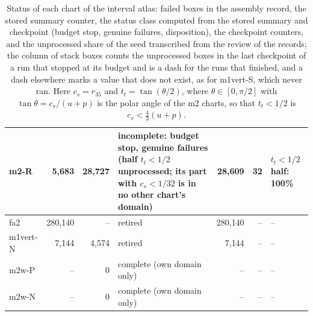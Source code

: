 \documentclass[11pt]{article}
\theoremstyle{definition}
\theoremstyle{remark}
\begin{document}
\begin{table}[t]
\begin{tabular}{@{}L{1.5cm}rrL{3.5cm}rrL{3.0cm}@{}}
m2-R & 5{,}683 & 28{,}727 & incomplete: budget stop, genuine failures (half $t_t<1/2$ unprocessed; its part with $c_s<1/32$ is in no other chart's domain) & 28{,}609 & 32 & $t_t<1/2$ half: 100\% \\
\midrule
fa2 & 280{,}140 & -- & retired & 280{,}140 & -- & -- \\
m1vert-N & 7{,}144 & 4{,}574 & retired & 7{,}144 & -- & -- \\
\midrule
m2w-P & -- & 0 & complete (own domain only) & -- & -- & -- \\
m2w-N & -- & 0 & complete (own domain only) & -- & -- & -- \\
\bottomrule
\end{tabular}
\caption{Status of each chart of the interval atlas: failed boxes in the assembly record, the stored summary counter, the status class computed from the stored summary and checkpoint (budget stop, genuine failures,
disposition), the checkpoint counters, and the unprocessed share of the seed transcribed from the review of the records; the column of stack boxes counts the unprocessed boxes in the last checkpoint of a run that stopped at its budget
and is a dash for the runs that finished, and a dash elsewhere marks a value that does not exist, as for m1vert-S, which never ran. Here $c_s=r_{35}$ and $t_t=\tan(\theta/2)$, where $\theta\in[0,\pi/2]$ with $\tan\theta=c_s/(u+p)$ is the polar angle of the m2 charts, so that $t_t<1/2$ is $c_s<\tfrac43(u+p)$.}\label{tab:atlas}
\end{table}
\end{document}
